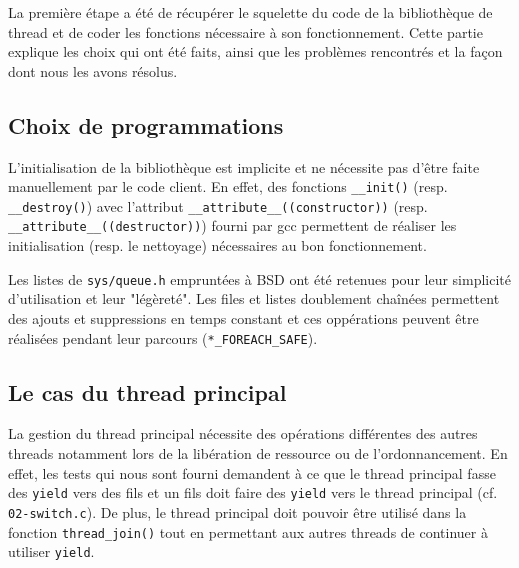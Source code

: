 La première étape a été de récupérer le squelette du code de la bibliothèque de thread et de coder les fonctions nécessaire à son fonctionnement. Cette partie explique les choix qui ont été faits, ainsi que les problèmes rencontrés et la façon dont nous les avons résolus.

\subsection{Choix de programmations}

L'initialisation de la bibliothèque est implicite et ne nécessite pas d'être faite manuellement par le code client. En effet, des fonctions \verb!__init()! (resp. \verb!__destroy()!) avec l'attribut \verb!__attribute__((constructor))! (resp. \verb!__attribute__((destructor))!) fourni par gcc permettent de réaliser les initialisation (resp. le nettoyage) nécessaires au bon fonctionnement.

Les listes de \verb!sys/queue.h! empruntées à BSD ont été retenues pour leur simplicité d'utilisation et leur "légèreté". Les files et listes doublement chaînées permettent des ajouts et suppressions en temps constant et ces oppérations peuvent être réalisées pendant leur parcours (\verb!*_FOREACH_SAFE!).


\subsection{Le cas du thread principal}

La gestion du thread principal nécessite des opérations différentes des autres threads notamment lors de la libération de ressource ou de l'ordonnancement. En effet, les tests qui nous sont fourni demandent à ce que le thread principal fasse des \verb!yield! vers des fils et un fils doit faire des \verb!yield! vers le thread principal (cf. \verb!02-switch.c!). De plus, le thread principal doit pouvoir être utilisé dans la fonction \verb!thread_join()! tout en permettant aux autres threads de continuer à utiliser \verb!yield!.
